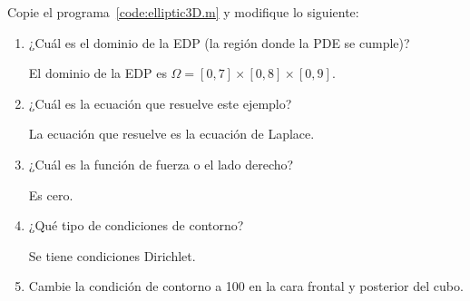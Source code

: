 \begin{problem}
Copie el programa~\ref{code:elliptic3D.m} y modifique lo siguiente:

\begin{enumerate}
      \item

            ¿Cuál es el dominio de la EDP (la región donde la PDE se
            cumple)?

            \begin{solution}
                  El dominio de la EDP es
                  \begin{math}
                        \Omega=
                        \left[
                              0,7
                              \right]\times
                        \left[
                              0,8
                              \right]\times
                        \left[
                              0,9
                              \right]
                  \end{math}.
            \end{solution}

      \item

            ¿Cuál es la ecuación que resuelve este ejemplo?

            \begin{solution}
                  La ecuación que resuelve es la ecuación de Laplace.
                  \noQED
            \end{solution}

      \item

            ¿Cuál es la función de fuerza o el lado derecho?

            \begin{solution}
                  Es cero.
                  \noQED
            \end{solution}

      \item

            ¿Qué tipo de condiciones de contorno?

            \begin{solution}
                  Se tiene condiciones Dirichlet.
                  \noQED
            \end{solution}

      \item

            Cambie la condición de contorno a 100 en la cara frontal
            y posterior del cubo.


\end{enumerate}
\end{problem}
